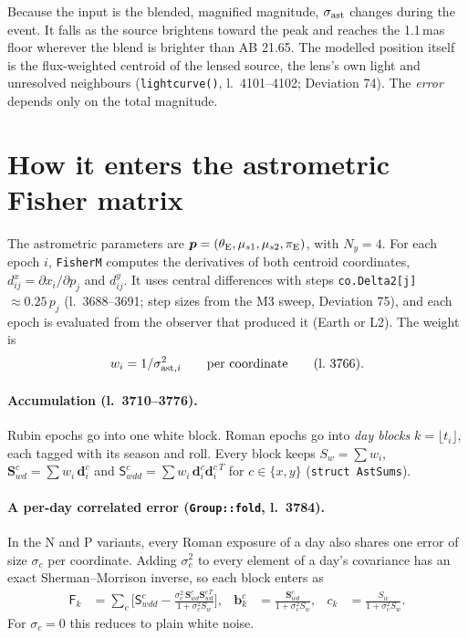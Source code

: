 \documentclass[english,10pt,a4paper]{article}
\newcommand{\piE}{\pi_{\rm E}}
\newcommand{\tetE}{\theta_{\rm E}}
\newcommand{\code}[1]{\texttt{#1}}
\begin{document}
Because the input is the blended, magnified magnitude, $\sigma_{\rm ast}$ changes during the event.
It falls as the source brightens toward the peak and reaches the 1.1\,mas floor wherever the blend
is brighter than AB 21.65. The modelled position itself is the flux-weighted centroid of the
lensed source, the lens's own light and unresolved neighbours (\code{lightcurve()}, l.~4101--4102;
Deviation 74). The \emph{error} depends only on the total magnitude.

\section{How it enters the astrometric Fisher matrix}
\label{sec:fisher}

The astrometric parameters are $\boldsymbol p=(\tetE,\mu_{s1},\mu_{s2},\piE)$, with $N_y=4$.
For each epoch $i$, \code{FisherM} computes the derivatives of both centroid coordinates,
$d^{x}_{ij}=\partial x_i/\partial p_j$ and $d^{y}_{ij}$. It uses central differences with steps
\code{co.Delta2[j]} $\approx 0.25\,p_j$ (l.~3688--3691; step sizes from the M3 sweep, Deviation 75),
and each epoch is evaluated from the observer that produced it (Earth or L2). The weight is
\begin{equation}
w_i = 1/\sigma_{{\rm ast},i}^2 \qquad\text{per coordinate} \qquad (\text{l.~3766}).
\end{equation}

\paragraph{Accumulation (l.~3710--3776).}
Rubin epochs go into one white block. Roman epochs go into \emph{day blocks}
$k=\lfloor t_i\rfloor$, each tagged with its season and roll. Every block keeps
$S_w=\sum w_i$, $\boldsymbol S^{c}_{wd}=\sum w_i\,\boldsymbol d^{c}_i$ and
$\mathsf S^{c}_{wdd}=\sum w_i\,\boldsymbol d^{c}_i\boldsymbol d^{c\,T}_i$ for $c\in\{x,y\}$
(\code{struct AstSums}).

\paragraph{A per-day correlated error (\code{Group::fold}, l.~3784).}
In the N and P variants, every Roman exposure of a day also shares one error of size $\sigma_c$
per coordinate. Adding $\sigma_c^2$ to every element of a day's covariance has an exact
Sherman--Morrison inverse, so each block enters as
\begin{align}
\mathsf F_k &= \sum_{c}\Big[\mathsf S^{c}_{wdd} - \frac{\sigma_c^2\,\boldsymbol S^{c}_{wd}\boldsymbol S^{c\,T}_{wd}}{1+\sigma_c^2 S_w}\Big], &
\boldsymbol b^{c}_k &= \frac{\boldsymbol S^{c}_{wd}}{1+\sigma_c^2 S_w}, &
c_k &= \frac{S_w}{1+\sigma_c^2 S_w}.
\end{align}
For $\sigma_c=0$ this reduces to plain white noise.
\end{document}
